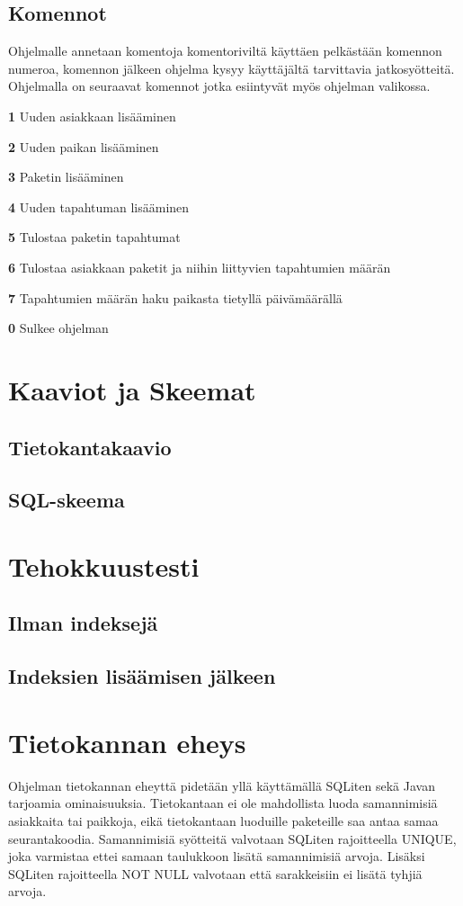 \documentclass[11pt,a4paper]{article}
\begin{document}
\subsection*{Komennot}
Ohjelmalle annetaan komentoja komentoriviltä käyttäen pelkästään komennon numeroa, komennon jälkeen ohjelma kysyy käyttäjältä tarvittavia jatkosyötteitä. Ohjelmalla on seuraavat komennot jotka esiintyvät myös ohjelman valikossa.
\begin{description}
\item \textbf{1} Uuden asiakkaan lisääminen
\item \textbf{2} Uuden paikan lisääminen
\item \textbf{3} Paketin lisääminen
\item \textbf{4} Uuden tapahtuman lisääminen
\item \textbf{5} Tulostaa paketin tapahtumat
\item \textbf{6} Tulostaa asiakkaan paketit ja niihin liittyvien tapahtumien määrän
\item \textbf{7} Tapahtumien määrän haku paikasta tietyllä päivämäärällä
\item \textbf{0} Sulkee ohjelman 
\end{description}

\newpage
\section{Kaaviot ja Skeemat}
\subsection*{Tietokantakaavio}

\subsection*{SQL-skeema}

\newpage
\section{Tehokkuustesti}
\subsection*{Ilman indeksejä}
\subsection*{Indeksien lisäämisen jälkeen}

\newpage
\section{Tietokannan eheys}
Ohjelman tietokannan eheyttä pidetään yllä käyttämällä SQLiten sekä Javan tarjoamia ominaisuuksia.
Tietokantaan ei ole mahdollista luoda samannimisiä asiakkaita tai paikkoja, eikä tietokantaan luoduille paketeille saa antaa samaa seurantakoodia. Samannimisiä syötteitä valvotaan SQLiten rajoitteella UNIQUE, joka varmistaa ettei samaan taulukkoon lisätä samannimisiä arvoja. Lisäksi SQLiten rajoitteella NOT NULL valvotaan että sarakkeisiin ei lisätä tyhjiä arvoja.
 
\end{document}
